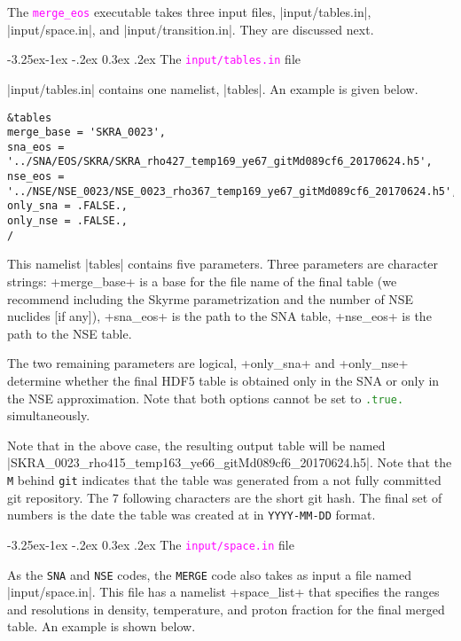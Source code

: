 \documentclass[letterpaper,11pt]{refart}
\makeatletter
\renewcommand\subsubsection{\@startsection{subsubsection}{3}{\z@}%
                           {-3.25ex\@plus -1ex \@minus -.2ex}%
                           {0.3ex \@plus .2ex}%
                           {\normalfont\normalsize\bf\fontsize{11}{13}\selectfont}}
\makeatother
\begin{document}
The \texttt{\textcolor{magenta}{merge\_eos}} executable takes three input 
files, \verbfile|input/tables.in|, \verbfile|input/space.in|, and 
\verbfile|input/transition.in|. They are discussed next.


\subsubsection{The \texttt{\textcolor{magenta}{input/tables.in}} file}
\label{sssec:Merge_tables}

\verbfile|input/tables.in| contains one namelist, \verbnml|tables|.
An example is given below. 


{\color{cyan}
\begin{verbatim}
&tables
merge_base = 'SKRA_0023',
sna_eos = '../SNA/EOS/SKRA/SKRA_rho427_temp169_ye67_gitMd089cf6_20170624.h5',
nse_eos = '../NSE/NSE_0023/NSE_0023_rho367_temp169_ye67_gitMd089cf6_20170624.h5',
only_sna = .FALSE.,
only_nse = .FALSE.,
/
\end{verbatim}}

This namelist \verbnml|tables| contains five parameters.  Three
parameters are character strings: \verbprm+merge_base+ is a base for the 
file name of the final table (we recommend including the Skyrme 
parametrization and the number of NSE nuclides [if any]),
\verbprm+sna_eos+ is the path to the SNA table,
\verbprm+nse_eos+ is the path to the NSE table.  

The two remaining parameters are logical,
\verbprm+only_sna+ and \verbprm+only_nse+ determine whether the final
HDF5 table is obtained only in the SNA or only in the NSE
approximation.  Note that both options cannot be set to
\texttt{\textcolor{ForestGreen}{.true.}} simultaneously.

Note that in the above case, the resulting output table will be named
\verbfile|SKRA_0023_rho415_temp163_ye66_gitMd089cf6_20170624.h5|. Note
that the \texttt{M} behind \texttt{git} indicates that the table was
generated from a not fully committed git repository. The 7 following
characters are the short git hash. The final set of numbers is the date
the table was created at in \texttt{YYYY-MM-DD} format.




\subsubsection{The \texttt{\textcolor{magenta}{input/space.in}} file}
\label{sssec:MERGE_phase}


As the \verb+SNA+ and \verb+NSE+ codes, the \verb+MERGE+ code also
takes as input a file named
\verbfile|input/space.in|.  This file has a namelist
\verbnml+space_list+ that specifies the ranges and resolutions in
density, temperature, and proton fraction for the final merged table.
An example is shown below.
\end{document}
